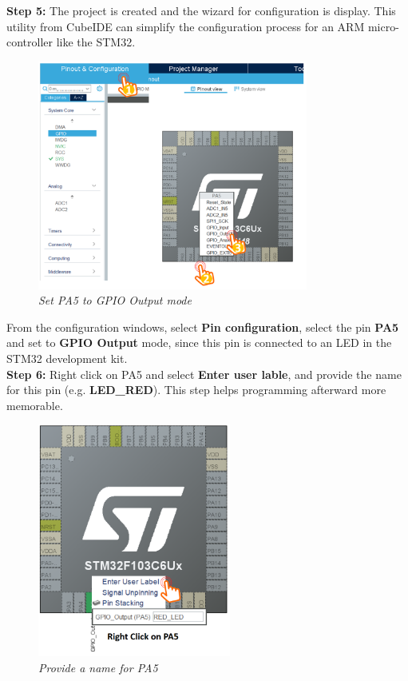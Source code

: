\textbf{Step 5: } The project is created and the wizard for configuration is display. This utility from CubeIDE can simplify the configuration process for an ARM micro-controller like the STM32.

\begin{figure}[!htp]
    \centering
    \includegraphics[width=3.5in]{source/picture/bai_1/stm_05.PNG}
    \caption{\textit{Set PA5 to GPIO Output mode}}
    \label{bai1_stm5}
\end{figure}

From the configuration windows, select \textbf{Pin configuration}, select the pin \textbf{PA5} and set to \textbf{GPIO Output} mode, since this pin is connected to an LED in the STM32 development kit.\\

\textbf{Step 6: } Right click on PA5 and select \textbf{Enter user lable}, and provide the name for this pin (e.g. \textbf{LED\_RED}). This step helps programming afterward more memorable.

\begin{figure}[!htp]
    \centering
    \includegraphics[width=2.5in]{source/picture/bai_1/stm_06.PNG}
    \caption{\textit{Provide a name for PA5}}
    \label{bai1_stm6}
\end{figure}

